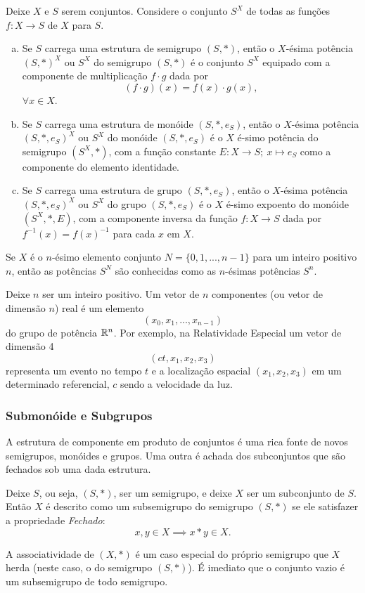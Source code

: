 \begin{definition}
  Deixe $X$ e $S$ serem conjuntos. Considere o conjunto $S^{X}$ de todas as funções $f: X\to S$ de $X$ para $S$.
  \begin{enumerate}[(a)]
    \item Se $S$ carrega uma estrutura de semigrupo $(S,*)$, então o $X$-ésima potência $(S,*)^{X}$ ou $S^{X}$ do semigrupo $(S,*)$ é o conjunto $S^X$ equipado com a componente de multiplicação $f\cdot g$ dada por $$(f\cdot g)(x)=f(x)\cdot g(x),$$ $\forall x \in X$.
    \item Se $S$ carrega uma estrutura de monóide $(S,*,e_{S})$, então o $X$-ésima potência $(S,*,e_{S})^{X}$ ou $S^X$ do monóide $(S,*,e_{S})$ é o $X$ é-simo potência do semigrupo $(S^X , *)$, com a função constante $E: X\to S;\ x\mapsto e_{S}$ como a componente do elemento identidade.
    \item Se $S$ carrega uma estrutura de grupo $(S,*,e_{S})$, então o $X$-ésima potência $(S,*,e_{S})^X$ ou $S^X$ do grupo $(S,*,e_{S})$ é o $X$ é-simo expoento do monóide $(S^X,*,E)$, com a componente inversa da função $f: X\to S$ dada por $f^{-1}(x)=f(x)^{-1}$ para cada $x$ em $X$.
  \end{enumerate}
\end{definition}

Se $X$ é o $n$-ésimo elemento conjunto $N=\{0,1,...,n-1\}$ para um inteiro positivo $n$, então as potências $S^N$ são conhecidas como as $n$-ésimas potências $S^n$.

\begin{exmp}[Vetores]
  Deixe $n$ ser um inteiro positivo. Um vetor de $n$ componentes (ou vetor de dimensão $n$) real é um elemento
  $$(x_{0},x_{1},...,x_{n-1})$$
  do grupo de potência $\mathbb{R}^n$. Por exemplo, na Relatividade Especial um vetor de dimensão 4
  $$(ct,x_{1},x_{2},x_{3})$$
  representa um evento no tempo $t$ e a localização espacial $(x_{1},x_{2},x_{3})$ em um determinado referencial, $c$ sendo a velocidade da luz.
\end{exmp}

\subsubsection{Submonóide e Subgrupos}
A estrutura de componente em produto de conjuntos é uma rica fonte de novos semigrupos, monóides e grupos.
Uma outra é achada dos subconjuntos que são fechados sob uma dada estrutura.
\begin{definition}[Subsemigrupos]
  Deixe $S$, ou seja, $(S,*)$, ser um semigrupo, e deixe $X$ ser um subconjunto de $S$. Então $X$ é descrito como um subsemigrupo do semigrupo $(S,*)$ se ele satisfazer a propriedade \emph{Fechado}:
  $$x,y \in X \implies x * y \in X.$$
\end{definition}
A associatividade de $(X, *)$ é um caso especial do próprio semigrupo que $X$ herda (neste caso, o do semigrupo $(S,*)$). É imediato que o conjunto vazio é um subsemigrupo de todo semigrupo.

